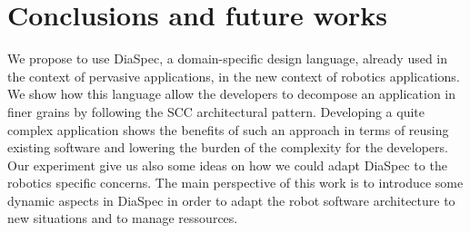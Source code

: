 
\section{Conclusions and future works}
\label{sec:conclusion}

We propose to use DiaSpec, a domain-specific design language, already used in the context of pervasive applications, in the new context of robotics applications. We show how this language allow the developers to decompose an application in finer grains by following the SCC architectural pattern.
Developing a quite complex application shows the benefits of such an approach in terms of reusing existing software and lowering the burden of the complexity for the developers. Our experiment give us also some ideas on how we could adapt DiaSpec to the robotics specific concerns.
The main perspective of this work is to introduce some dynamic aspects in DiaSpec in order to adapt the robot software architecture to new situations and to manage ressources.